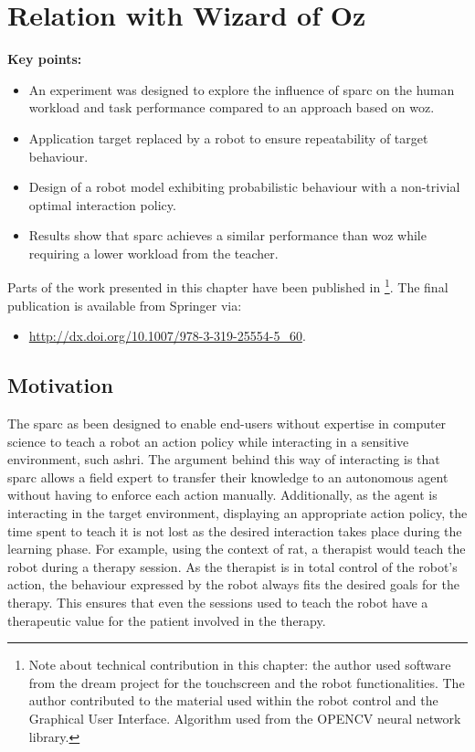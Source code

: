 \chapter{Relation with Wizard of Oz}\label{chap:woz}
\glsresetall
\graphicspath{{images/woz/}}

\begin{framed}
	\textbf{Key points:}
	
	\begin{itemize}
		\item An experiment was designed to explore the influence of \gls{sparc} on the human workload and task performance compared to an approach based on \gls{woz}.
		\item Application target replaced by a robot to ensure repeatability of target behaviour.
		\item Design of a robot model exhibiting probabilistic behaviour with a non-trivial optimal interaction policy.
		\item Results show that \gls{sparc} achieves a similar performance than \gls{woz} while requiring a lower workload from the teacher.
	\end{itemize}
\end{framed}

Parts of the work presented in this chapter have been published in \cite{senft2015sparc}\footnote{Note about technical contribution in this chapter: the author used software from the \gls{dream} project for the touchscreen and the robot functionalities. The author contributed to the material used within the robot control and the Graphical User Interface. Algorithm used from the OPENCV neural network library.}. The final publication is available from Springer via:
\begin{itemize}
	\item \url{http://dx.doi.org/10.1007/978-3-319-25554-5_60}.
\end{itemize} 

\newpage

\section{Motivation}

The \gls{sparc} as been designed to enable end-users without expertise in computer science to teach a robot an action policy while interacting in a sensitive environment, such as\gls{hri}. The argument behind this way of interacting is that \gls{sparc} allows a field expert to transfer their knowledge to an autonomous agent without having to enforce each action manually. Additionally, as the agent is interacting in the target environment, displaying an appropriate action policy, the time spent to teach it is not lost as the desired interaction takes place during the learning phase. For example, using the context of \gls{rat}, a therapist would teach the robot during a therapy session. As the therapist is in total control of the robot's action, the behaviour expressed by the robot always fits the  desired goals for the therapy. This ensures that even the sessions used to teach the robot have a therapeutic value for the patient involved in the therapy.

